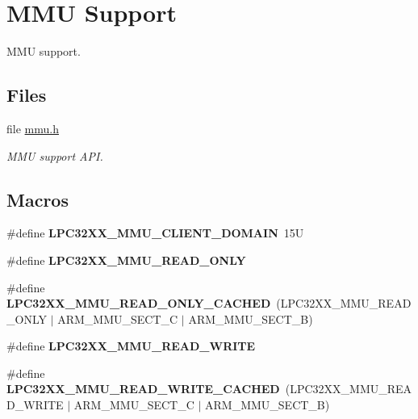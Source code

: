 \hypertarget{group__lpc32xx__mmu}{}\section{M\+MU Support}
\label{group__lpc32xx__mmu}


M\+MU support.  


\subsection*{Files}
\begin{DoxyCompactItemize}
\item 
file \mbox{\hyperlink{arm_2lpc32xx_2include_2bsp_2mmu_8h}{mmu.\+h}}
\begin{DoxyCompactList}\small\item\em M\+MU support A\+PI. \end{DoxyCompactList}\end{DoxyCompactItemize}
\subsection*{Macros}
\begin{DoxyCompactItemize}
\item 
\mbox{\label{group__lpc32xx__mmu_ga6f076a47b84602268e468b3ffff25421}} 
\#define {\bfseries L\+P\+C32\+X\+X\+\_\+\+M\+M\+U\+\_\+\+C\+L\+I\+E\+N\+T\+\_\+\+D\+O\+M\+A\+IN}~15U
\item 
\#define {\bfseries L\+P\+C32\+X\+X\+\_\+\+M\+M\+U\+\_\+\+R\+E\+A\+D\+\_\+\+O\+N\+LY}
\item 
\mbox{\label{group__lpc32xx__mmu_gaeb89effd7e71a40ae15652bb031600b3}} 
\#define {\bfseries L\+P\+C32\+X\+X\+\_\+\+M\+M\+U\+\_\+\+R\+E\+A\+D\+\_\+\+O\+N\+L\+Y\+\_\+\+C\+A\+C\+H\+ED}~(L\+P\+C32\+X\+X\+\_\+\+M\+M\+U\+\_\+\+R\+E\+A\+D\+\_\+\+O\+N\+LY $\vert$ A\+R\+M\+\_\+\+M\+M\+U\+\_\+\+S\+E\+C\+T\+\_\+C $\vert$ A\+R\+M\+\_\+\+M\+M\+U\+\_\+\+S\+E\+C\+T\+\_\+B)
\item 
\#define {\bfseries L\+P\+C32\+X\+X\+\_\+\+M\+M\+U\+\_\+\+R\+E\+A\+D\+\_\+\+W\+R\+I\+TE}
\item 
\mbox{\label{group__lpc32xx__mmu_ga7f2bbf9035bbf2bb6ba4548929c59033}} 
\#define {\bfseries L\+P\+C32\+X\+X\+\_\+\+M\+M\+U\+\_\+\+R\+E\+A\+D\+\_\+\+W\+R\+I\+T\+E\+\_\+\+C\+A\+C\+H\+ED}~(L\+P\+C32\+X\+X\+\_\+\+M\+M\+U\+\_\+\+R\+E\+A\+D\+\_\+\+W\+R\+I\+TE $\vert$ A\+R\+M\+\_\+\+M\+M\+U\+\_\+\+S\+E\+C\+T\+\_\+C $\vert$ A\+R\+M\+\_\+\+M\+M\+U\+\_\+\+S\+E\+C\+T\+\_\+B)
\end{DoxyCompactItemize}


